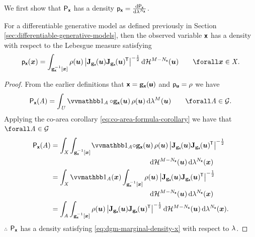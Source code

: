 We first show that $\mathsf{P}_{\boldsymbol{\mathsf{x}}}$ has a density $\pden{\rvct{x}} = \td{\prob{\rvct{x}}}{\lebm{N_{\rvct{x}}}}$.

\begin{proposition}
For a differentiable generative model as defined previously in Section \ref{sec:differentiable-generative-models}, then the observed variable $\boldsymbol{\mathsf{x}}$ has a density with respect to the Lebesgue measure satisfying
\begin{equation}\label{eq:dgm-marginal-density-x}
  \pden{\rvct{x}}({\vct{x}})  =
  \int_{\genfunc_{\rvct{x}}^{-1}[\vct{x}]}
    \rho(\vct{u})\,
    \left|
      \jacob{\genfunc_{\rvct{x}}}{\vct{u}}
      \jacob{\genfunc_{\rvct{x}}}{\vct{u}}\phantom{}\tr
    \right|^{-\frac{1}{2}}
  \,\dr\haum{M-N_{\rvct{x}}}(\vct{u})
  \qquad \forall \vct{x} \in\set{X}.
\end{equation}
\end{proposition}
\begin{proof}
From the earlier definitions that $\boldsymbol{\mathsf{x}} = {\mathbf{g}}_{\boldsymbol{\mathsf{x}}}(\boldsymbol{\mathsf{u}})$ and $\mathsf{p}_{\boldsymbol{\mathsf{u}}} = \rho$ we have
\begin{equation}
  \prob{\rvct{x}}(\set{A}) 
  =
  \int_{\set{U}} 
    \ind{\set{A}}\circ\genfunc_{\rvct{x}}(\vct{u})\,\rho(\vct{u})
  \,\dr\lebm{M}(\vct{u})
  \qquad \forall \set{A} \in\sset{G}.
\end{equation}
Applying the co-area corollary \eqref{eq:co-area-formula-corollary} we have that $\forall \set{A} \in\sset{G}$
\begin{align}
  \prob{\rvct{x}}(\set{A})  &=
  \int_{\set{X}}
  \int_{\preimage{\genfunc_{\rvct{x}}}{\vct{x}}}\kern-1pt
    \ind{\set{A}}\!\circ\genfunc_{\rvct{x}}(\vct{u})\,\rho(\vct{u})\,
    \left|
      \jacob{\genfunc_{\rvct{x}}}{\vct{u}}
      \jacob{\genfunc_{\rvct{x}}}{\vct{u}}\phantom{}\tr
    \right|^{-\frac{1}{2}}\\ \nonumber 
  &\qquad\qquad\qquad\qquad\qquad\qquad\qquad
  \,\dr\haum{M-{N_{\rvct{x}}}}(\vct{u})
  \,\dr\lebm{N_{\rvct{x}}}(\vct{x})
  \\
  &=
  \int_{\set{X}}
  \ind{\set{A}}(\vct{x})
  \int_{\preimage{\genfunc_{\rvct{x}}}{\vct{x}}} 
   \rho(\vct{u})\,
    \left|
      \jacob{\genfunc_{\rvct{x}}}{\vct{u}}
      \jacob{\genfunc_{\rvct{x}}}{\vct{u}}\phantom{}\tr
    \right|^{-\frac{1}{2}}\\ \nonumber 
  &\qquad\qquad\qquad\qquad\qquad\qquad\qquad
  \,\dr\haum{M-{N_{\rvct{x}}}}(\vct{u})
  \,\dr\lebm{N_{\rvct{x}}}(\vct{x})\\
  &=
  \int_{\set{A}}
  \int_{\preimage{\genfunc_{\rvct{x}}}{\vct{x}}} 
   \rho(\vct{u})\,
    \left|
      \jacob{\genfunc_{\rvct{x}}}{\vct{u}}
      \jacob{\genfunc_{\rvct{x}}}{\vct{u}}\phantom{}\tr
    \right|^{-\frac{1}{2}}
  \,\dr\haum{M-{N_{\rvct{x}}}}(\vct{u})
  \,\dr\lebm{N_{\rvct{x}}}(\vct{x}).
\end{align}
$\therefore$ $\mathsf{P}_{\boldsymbol{\mathsf{x}}}$ has a density satisfying \eqref{eq:dgm-marginal-density-x} with respect to $\lebm{}$. \qedhere
\end{proof}
